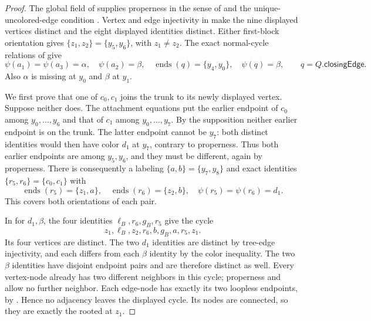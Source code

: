 \begin{proof}
The global field of  supplies
properness in the sense of  and the
unique-uncolored-edge condition .
Vertex and edge injectivity in  make the nine
displayed vertices distinct and the eight displayed identities distinct.
Either first-block orientation gives $\{z_1,z_2\}=\{y_5,y_6\}$,
with $z_1\ne z_2$.  The exact normal-cycle relations of
 give
\[
 \psi(a_1)=\psi(a_3)=\alpha,\quad \psi(a_2)=\beta,
 \quad\operatorname{ends}(q)=\{y_4,y_0\},\quad\psi(q)=\beta,
 \qquad q=Q.\mathsf{closingEdge}.
\]
Also $\alpha$ is missing at $y_0$ and $\beta$ at $y_1$.

We first prove that one of $c_0,c_1$ joins the trunk to its newly
displayed vertex.  Suppose neither does.  The attachment equations put
the earlier endpoint of $c_0$ among $y_0,\ldots,y_6$ and that of $c_1$
among $y_0,\ldots,y_7$.  By the supposition neither earlier endpoint is
on the trunk.  The latter endpoint cannot be $y_7$: both distinct
identities would then have color $d_1$ at $y_7$, contrary to properness.
Thus both earlier endpoints are among $y_5,y_6$, and they must be
different, again by properness.  There is consequently a labeling
$\{a,b\}=\{y_7,y_8\}$ and exact identities
$\{r_5,r_6\}=\{c_0,c_1\}$ with
\[
 \operatorname{ends}(r_5)=\{z_1,a\},\quad
 \operatorname{ends}(r_6)=\{z_2,b\},\quad
 \psi(r_5)=\psi(r_6)=d_1.
\]
This covers both orientations of each pair.

In  for $d_1,\beta$, the four
identities $\ell_B,r_6,g_B,r_5$ give the cycle
\[
 z_1,\ell_B,z_2,r_6,b,g_B,a,r_5,z_1.
\]
Its four vertices are distinct.  The two $d_1$ identities are distinct
by tree-edge injectivity, and each differs from each $\beta$ identity
by the color inequality.  The two $\beta$ identities have disjoint
endpoint pairs and are therefore distinct as well.  Every vertex-node
already has two different neighbors in this cycle; properness and
 allow no further neighbor.
Each edge-node has exactly its two loopless endpoints, by
.  Hence no adjacency leaves the displayed cycle.
Its nodes are connected, so they are exactly the
 rooted at $z_1$.


\end{proof}
